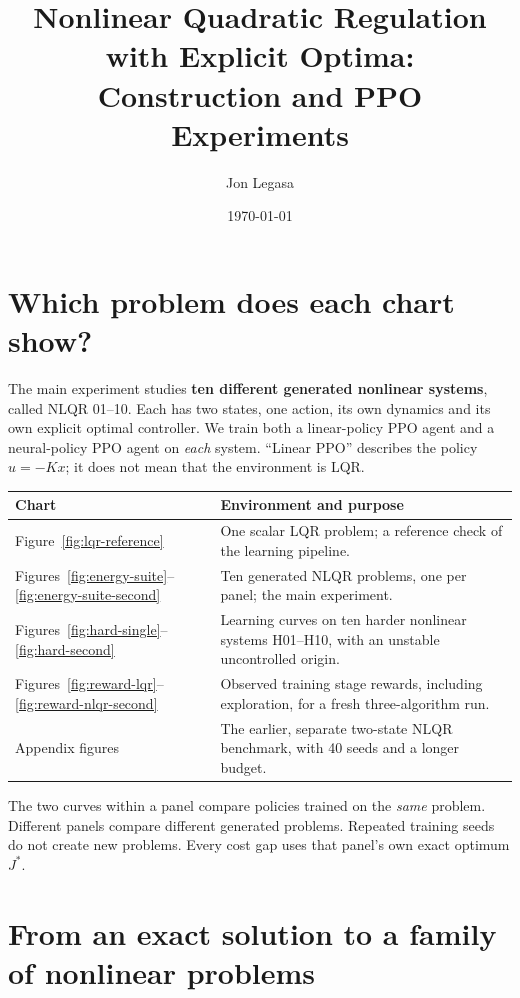 \documentclass[11pt]{article}
\title{Nonlinear Quadratic Regulation with Explicit Optima:\\Construction and PPO Experiments}
\author{Jon Legasa}
\date{\today}
\begin{document}
\maketitle

\tableofcontents
\clearpage

\section*{Which problem does each chart show?}

The main experiment studies \textbf{ten different generated nonlinear systems},
called NLQR 01--10. Each has two states, one action, its own dynamics and its own
explicit optimal controller. We train both a linear-policy PPO agent and a neural-policy
PPO agent on \emph{each} system. ``Linear PPO'' describes the policy
$u=-Kx$; it does not mean that the environment is LQR.

\begin{center}
\begin{tabular}{@{}lp{9.3cm}@{}}
\toprule
Chart & Environment and purpose \\
\midrule
Figure~\ref{fig:lqr-reference} & One scalar LQR problem; a reference check of the learning pipeline. \\
Figures~\ref{fig:energy-suite}--\ref{fig:energy-suite-second} & Ten generated NLQR problems, one per panel; the main experiment. \\
Figures~\ref{fig:hard-single}--\ref{fig:hard-second} & Learning curves on ten harder nonlinear systems H01--H10, with an unstable uncontrolled origin. \\
Figures~\ref{fig:reward-lqr}--\ref{fig:reward-nlqr-second} & Observed training stage rewards, including exploration, for a fresh three-algorithm run. \\
Appendix figures & The earlier, separate two-state NLQR benchmark, with 40 seeds and a longer budget. \\
\bottomrule
\end{tabular}
\end{center}
The two curves within a panel compare policies trained on the \emph{same} problem.
Different panels compare different generated problems. Repeated training seeds do
not create new problems. Every cost gap uses that panel's own exact optimum $J^*$.

\section{From an exact solution to a family of nonlinear problems}
\label{sec:generator}
\end{document}
